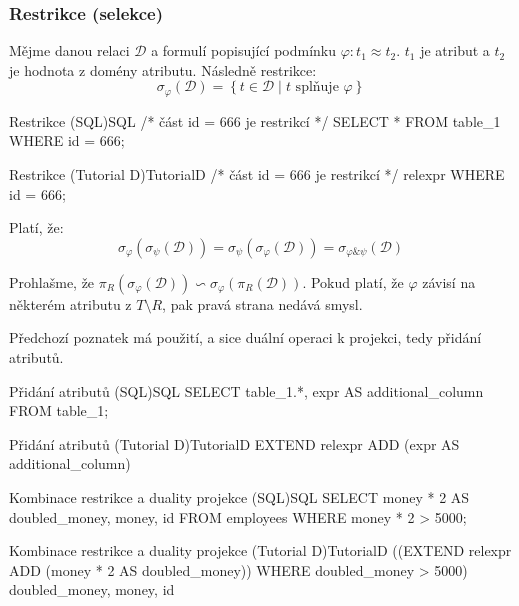 \subsubsection{Restrikce (selekce)}
Mějme danou relaci $\mathcal{D}$ a formulí popisující podmínku $\varphi : t_{1} \approx t_{2}$. $t_{1}$ je atribut a $t_{2}$ je hodnota z domény atributu. Následně restrikce:
$$
\sigma_{\varphi}(\mathcal{D}) = \left\{ t \in \mathcal{D} \; | \; t \text{ splňuje } \varphi \right\}
$$
\begin{upcode}{Restrikce (SQL)}{}{SQL}
/* část id = 666 je restrikcí */
SELECT * FROM table_1 WHERE id = 666;
\end{upcode}
\begin{upcode}{Restrikce (Tutorial D)}{}{TutorialD}
/* část id = 666 je restrikcí */
relexpr WHERE id = 666;
\end{upcode}
\begin{upquote}
Platí, že:
$$
\sigma_{\varphi}(\sigma_{\psi}(\mathcal{D})) = \sigma_{\psi}(\sigma_{\varphi}(\mathcal{D})) = \sigma_{\varphi \& \psi}(\mathcal{D})
$$
\end{upquote}

Prohlašme, že $\pi_{R} (\sigma_{\varphi} (\mathcal{D})) \backsim \sigma_{\varphi} (\pi_{R} (\mathcal{D}))$. Pokud platí, že $\varphi$ závisí na některém atributu z $T \setminus R$, pak pravá strana nedává smysl.

Předchozí poznatek má použití, a sice duální operaci k projekci, tedy přidání atributů.
\begin{upcode}{Přidání atributů (SQL)}{}{SQL}
SELECT table_1.*, expr AS additional_column FROM table_1;
\end{upcode}
\begin{upcode}{Přidání atributů (Tutorial D)}{}{TutorialD}
EXTEND relexpr ADD (expr AS additional_column)
\end{upcode}
\begin{upcode}{Kombinace restrikce a duality projekce (SQL)}{}{SQL}
SELECT	money * 2 AS doubled_money, money, id
FROM 	employees
WHERE	money * 2 > 5000;
\end{upcode}
\begin{upcode}{Kombinace restrikce a duality projekce (Tutorial D)}{}{TutorialD}
((EXTEND relexpr ADD (money * 2 AS doubled_money))
WHERE doubled_money > 5000) {doubled_money, money, id}
\end{upcode}